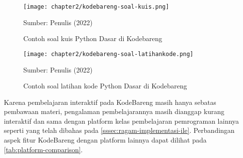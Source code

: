 \begin{figure}[H]
  \centering
  \texttt{[image: chapter2/kodebareng-soal-kuis.png]}
  \caption{Contoh soal kuis Python Dasar di Kodebareng}\label{fig:kodebareng-soal-kuis}
  Sumber: Penulis (2022)
\end{figure}

\begin{figure}[H]
  \centering
  \texttt{[image: chapter2/kodebareng-soal-latihankode.png]}
  \caption{Contoh soal latihan kode Python Dasar di Kodebareng}\label{fig:kodebareng-soal-latihankode}
  Sumber: Penulis (2022)
\end{figure}

Karena pembelajaran interaktif pada KodeBareng masih hanya sebatas pembawaan materi, pengalaman pembelajarannya masih dianggap kurang interaktif dan sama dengan platform kelas pembelajaran pemrograman lainnya seperti yang telah dibahas pada \autoref{sssec:ragam-implementasi-ile}. Perbandingan aspek fitur KodeBareng dengan platform lainnya dapat dilihat pada \autoref{tab:platform-comparison}.

